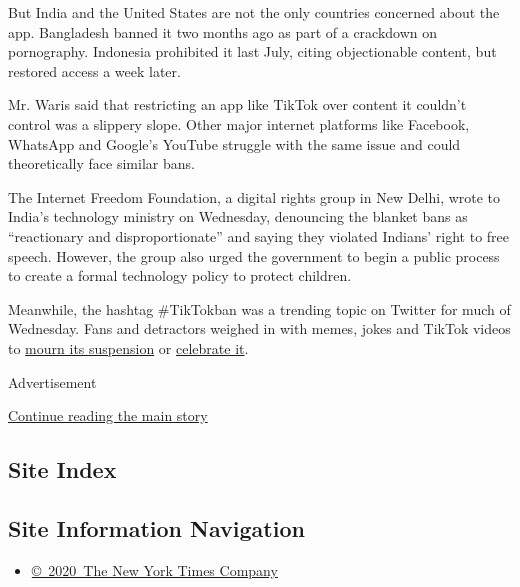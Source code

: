 But India and the United States are not the only countries concerned
about the app. Bangladesh banned it two months ago as part of a
crackdown on pornography. Indonesia prohibited it last July, citing
objectionable content, but restored access a week later.

Mr. Waris said that restricting an app like TikTok over content it
couldn't control was a slippery slope. Other major internet platforms
like Facebook, WhatsApp and Google's YouTube struggle with the same
issue and could theoretically face similar bans.

The Internet Freedom Foundation, a digital rights group in New Delhi,
wrote to India's technology ministry on Wednesday, denouncing the
blanket bans as ``reactionary and disproportionate'' and saying they
violated Indians' right to free speech. However, the group also urged
the government to begin a public process to create a formal technology
policy to protect children.

Meanwhile, the hashtag \#TikTokban was a trending topic on Twitter for
much of Wednesday. Fans and detractors weighed in with memes, jokes and
TikTok videos to
\href{https://twitter.com/bhuvanhere/status/1118527243460890625}{mourn
its suspension} or
\href{https://twitter.com/KainaatTanga/status/1118533471553478656}{celebrate
it}.

Advertisement

\protect\hyperlink{after-bottom}{Continue reading the main story}

\hypertarget{site-index}{%
\subsection{Site Index}\label{site-index}}

\hypertarget{site-information-navigation}{%
\subsection{Site Information
Navigation}\label{site-information-navigation}}

\begin{itemize}
\tightlist
\item
  \href{https://help.nytimes.com/hc/en-us/articles/115014792127-Copyright-notice}{©~2020~The
  New York Times Company}
\end{itemize}

